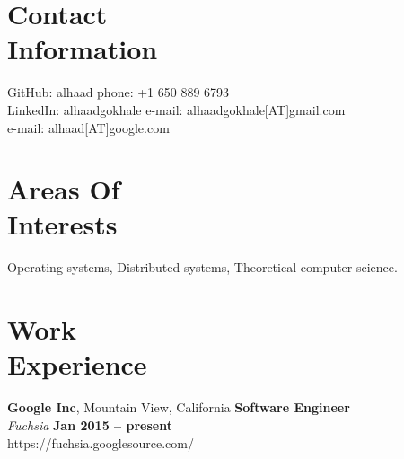 \documentclass[margin,line]{resume}
\begin{document}
\begin{resume}

    \section{\mysidestyle Contact\\Information}

    GitHub: alhaad                            \hfill phone: +1 650 889 6793          \vspace{0mm}\\\vspace{0mm}%
    LinkedIn: alhaadgokhale                          \hfill e-mail: alhaadgokhale[AT]gmail.com          \vspace{0mm}\\\vspace{0mm}%
    \hfill e-mail: alhaad[AT]google.com  \vspace{0mm}\\\vspace{-4.5mm}%


    \section{\mysidestyle Areas Of\\Interests}

    Operating systems, Distributed systems, Theoretical computer science.

    \section{\mysidestyle Work\\Experience}

    \textbf{Google Inc}, Mountain View, California \hfill \textbf{Software Engineer} \vspace{2mm}\\\vspace{1mm}%
    \textsl{Fuchsia} \hfill \textbf{Jan 2015 -- present}\\
    https://fuchsia.googlesource.com/


\end{resume}
\end{document}
